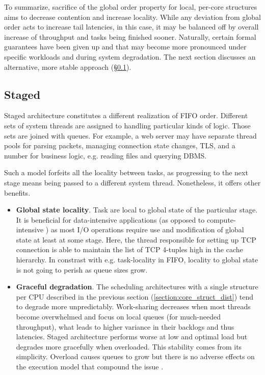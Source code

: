 \documentclass[12pt,a4paper,twoside]{report}
\begin{document}
To summarize, sacrifice of the global order property for local, per-core structures aims to decrease contention and increase locality. While any deviation from global order acts to increase tail latencies, in this case, it may be balanced off by overall increase of throughput and tasks being finished sooner. Naturally, certain formal guarantees have been given up and that may become more pronounced under specific workloads and during system degradation. The next section discusses an alternative, more stable approach (\S\ref{section:design-staged}).
    
\subsection{Staged}
\label{section:design-staged}

Staged architecture \cite{Welsh2001} constitutes a different realization of FIFO order. Different sets of system threads are assigned to handling particular kinds of logic. Those sets are joined with queues. For example, a web server may have separate thread pools for parsing packets, managing connection state changes, TLS, and a number for business logic, e.g. reading files and querying DBMS.  

Such a model forfeits all the locality between tasks, as progressing to the next stage means being passed to a different system thread. Nonetheless, it offers other benefits. 
\begin{itemize}
    \item \textbf{Global state locality}. Task are local to global state of the particular stage. It is beneficial for data-intensive applications (as opposed to compute-intensive \cite{Kleppmann2017-en}) as most I/O operations require use and modification of global state at least at some stage. Here, the thread responsible for setting up TCP connection is able to maintain the list of TCP 4-tuples high in the cache hierarchy. In constrast with e.g. task-locality in FIFO, locality to global state is not going to perish as queue sizes grow.
    \item \textbf{Graceful degradation}. The scheduling architectures with a single  structure per CPU described in the previous section (\ref{section:core_struct_dist}) tend to degrade more unpredictably. Work-sharing decreases when most threads become overwhelmed and focus on local queues (for much-needed throughput), what leads to higher variance in their backlogs and thus latencies. Staged architecture performs worse at low and optimal load but degrades more gracefully when overloaded. This stability comes from its simplicity. Overload causes queues to grow but there is no adverse effects on the execution model that compound the issue \cite{Welsh2001}.
\end{itemize}
\end{document}
